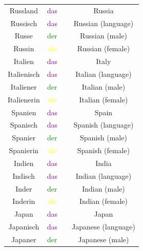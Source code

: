 \begin{center}
\begin{longtable} {|c|c|c|c|}
        \hline
        Russland       & \textcolor{purple}{das}   &                     & Russia               \\
        Russisch       & \textcolor{purple}{das}   &                     & Russian (language)   \\
        Russe          & \textcolor{green}{der}    &                     & Russian (male)       \\
        Russin         & \textcolor{yellow}{die}   &                     & Russian (female)     \\
        \hline
        Italien        & \textcolor{purple}{das}   &                     & Italy                \\
        Italienisch    & \textcolor{purple}{das}   &                     & Italian (language)   \\
        Italiener      & \textcolor{green}{der}    &                     & Italian (male)       \\
        Italienerin    & \textcolor{yellow}{die}   &                     & Italian (female)     \\
        \hline
        Spanien        & \textcolor{purple}{das}   &                     & Spain                \\
        Spanisch       & \textcolor{purple}{das}   &                     & Spanish (language)   \\
        Spanier        & \textcolor{green}{der}    &                     & Spanish (male)       \\
        Spanierin      & \textcolor{yellow}{die}   &                     & Spanish (female)     \\
        \hline
        Indien         & \textcolor{purple}{das}   &                     & India                \\
        Indisch        & \textcolor{purple}{das}   &                     & Indian (language)    \\
        Inder          & \textcolor{green}{der}    &                     & Indian (male)        \\
        Inderin        & \textcolor{yellow}{die}   &                     & Indian (female)      \\
        \hline
        Japan          & \textcolor{purple}{das}   &                     & Japan                \\
        Japanisch      & \textcolor{purple}{das}   &                     & Japanese (language)  \\
        Japaner        & \textcolor{green}{der}    &                     & Japanese (male)      \\

\end{longtable}
\end{center}
